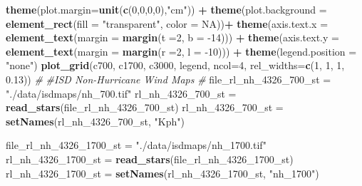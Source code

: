 \documentclass[12pt,oneside]{reedthesis}
\newenvironment{Shaded}{\begin{snugshade}}{\end{snugshade}}
\newcommand{\CommentTok}[1]{\textcolor[rgb]{0.56,0.35,0.01}{\textit{#1}}}
\newcommand{\DataTypeTok}[1]{\textcolor[rgb]{0.13,0.29,0.53}{#1}}
\newcommand{\DecValTok}[1]{\textcolor[rgb]{0.00,0.00,0.81}{#1}}
\newcommand{\FloatTok}[1]{\textcolor[rgb]{0.00,0.00,0.81}{#1}}
\newcommand{\KeywordTok}[1]{\textcolor[rgb]{0.13,0.29,0.53}{\textbf{#1}}}
\newcommand{\NormalTok}[1]{#1}
\newcommand{\OperatorTok}[1]{\textcolor[rgb]{0.81,0.36,0.00}{\textbf{#1}}}
\newcommand{\OtherTok}[1]{\textcolor[rgb]{0.56,0.35,0.01}{#1}}
\newcommand{\StringTok}[1]{\textcolor[rgb]{0.31,0.60,0.02}{#1}}
\begin{document}
\begin{Shaded}
\begin{Highlighting}[]
\StringTok{  }\KeywordTok{theme}\NormalTok{(}\DataTypeTok{plot.margin=}\KeywordTok{unit}\NormalTok{(}\KeywordTok{c}\NormalTok{(}\DecValTok{0}\NormalTok{,}\DecValTok{0}\NormalTok{,}\DecValTok{0}\NormalTok{,}\DecValTok{0}\NormalTok{),}\StringTok{"cm"}\NormalTok{)) }\OperatorTok{+}
\StringTok{  }\KeywordTok{theme}\NormalTok{(}\DataTypeTok{plot.background =} \KeywordTok{element_rect}\NormalTok{(}\DataTypeTok{fill =} \StringTok{"transparent"}\NormalTok{, }\DataTypeTok{color =} \OtherTok{NA}\NormalTok{))}\OperatorTok{+}
\StringTok{  }\KeywordTok{theme}\NormalTok{(}\DataTypeTok{axis.text.x =} \KeywordTok{element_text}\NormalTok{(}\DataTypeTok{margin =}  \KeywordTok{margin}\NormalTok{(}\DataTypeTok{t =}\DecValTok{2}\NormalTok{, }\DataTypeTok{b =} \DecValTok{-14}\NormalTok{))) }\OperatorTok{+}\StringTok{ }
\StringTok{  }\KeywordTok{theme}\NormalTok{(}\DataTypeTok{axis.text.y =} \KeywordTok{element_text}\NormalTok{(}\DataTypeTok{margin =}  \KeywordTok{margin}\NormalTok{(}\DataTypeTok{r =}\DecValTok{2}\NormalTok{, }\DataTypeTok{l =} \DecValTok{-10}\NormalTok{))) }\OperatorTok{+}
\StringTok{  }\KeywordTok{theme}\NormalTok{(}\DataTypeTok{legend.position =} \StringTok{"none"}\NormalTok{)}
\KeywordTok{plot_grid}\NormalTok{(c700, c1700, c3000, legend, }\DataTypeTok{ncol=}\DecValTok{4}\NormalTok{, }\DataTypeTok{rel_widths=}\KeywordTok{c}\NormalTok{(}\DecValTok{1}\NormalTok{, }\DecValTok{1}\NormalTok{, }\DecValTok{1}\NormalTok{, }\FloatTok{0.13}\NormalTok{))}
\CommentTok{#}
\CommentTok{#ISD Non-Hurricane Wind Maps}
\CommentTok{#}
\NormalTok{file_rl_nh_}\DecValTok{4326}\NormalTok{_}\DecValTok{700}\NormalTok{_st =}\StringTok{ "./data/isdmaps/nh_700.tif"}
\NormalTok{rl_nh_}\DecValTok{4326}\NormalTok{_}\DecValTok{700}\NormalTok{_st =}\StringTok{ }\KeywordTok{read_stars}\NormalTok{(file_rl_nh_}\DecValTok{4326}\NormalTok{_}\DecValTok{700}\NormalTok{_st)}
\NormalTok{rl_nh_}\DecValTok{4326}\NormalTok{_}\DecValTok{700}\NormalTok{_st =}\StringTok{ }\KeywordTok{setNames}\NormalTok{(rl_nh_}\DecValTok{4326}\NormalTok{_}\DecValTok{700}\NormalTok{_st, }\StringTok{"Kph"}\NormalTok{)}

\NormalTok{file_rl_nh_}\DecValTok{4326}\NormalTok{_}\DecValTok{1700}\NormalTok{_st =}\StringTok{ "./data/isdmaps/nh_1700.tif"}
\NormalTok{rl_nh_}\DecValTok{4326}\NormalTok{_}\DecValTok{1700}\NormalTok{_st =}\StringTok{ }\KeywordTok{read_stars}\NormalTok{(file_rl_nh_}\DecValTok{4326}\NormalTok{_}\DecValTok{1700}\NormalTok{_st)}
\NormalTok{rl_nh_}\DecValTok{4326}\NormalTok{_}\DecValTok{1700}\NormalTok{_st =}\StringTok{ }\KeywordTok{setNames}\NormalTok{(rl_nh_}\DecValTok{4326}\NormalTok{_}\DecValTok{1700}\NormalTok{_st, }\StringTok{"nh_1700"}\NormalTok{)}
 

\end{Highlighting}
\end{Shaded}
\end{document}
